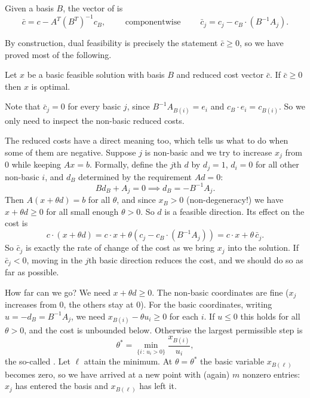 \documentclass[a4paper]{scrartcl}
\begin{document}
\begin{definition}
    Given a basis $B$, the vector of  is
    $$
    \bar c = c - A^T(B^T)^{-1}c_B, \qquad\text{ componentwise }\qquad \bar c_j = c_j - c_B\cdot(B^{-1}A_j).
    $$
\end{definition}

By construction, dual feasibility is precisely the statement $\bar c \geq 0$, so we have proved most of the following.

\begin{theorem}
    Let $x$ be a basic feasible solution with basis $B$ and reduced cost vector $\bar c$. If $\bar c \geq 0$ then $x$ is optimal.
\end{theorem}

Note that $\bar c_j = 0$ for every basic $j$, since $B^{-1}A_{B(i)} = e_i$ and $c_B \cdot e_i = c_{B(i)}$. So we only need to inspect the non-basic reduced costs.

The reduced costs have a direct meaning too, which tells us what to do when some of them are negative. Suppose $j$ is non-basic and we try to increase $x_j$ from $0$ while keeping $Ax = b$. Formally, define the $j$th  $d$ by $d_j = 1$, $d_i = 0$ for all other non-basic $i$, and $d_B$ determined by the requirement $Ad = 0$:
$$
Bd_B + A_j = 0 \implies d_B = -B^{-1}A_j.
$$
Then $A(x + \theta d) = b$ for all $\theta$, and since $x_B > 0$ (non-degeneracy!) we have $x + \theta d \geq 0$ for all small enough $\theta > 0$. So $d$ is a feasible direction. Its effect on the cost is
$$
c\cdot(x + \theta d) = c\cdot x + \theta\left(c_j - c_B\cdot(B^{-1}A_j)\right) = c\cdot x + \theta\,\bar c_j.
$$
So $\bar c_j$ is exactly the rate of change of the cost as we bring $x_j$ into the solution. If $\bar c_j < 0$, moving in the $j$th basic direction reduces the cost, and we should do so as far as possible.

How far can we go? We need $x + \theta d \geq 0$. The non-basic coordinates are fine ($x_j$ increases from $0$, the others stay at $0$). For the basic coordinates, writing $u = -d_B = B^{-1}A_j$, we need $x_{B(i)} - \theta u_i \geq 0$ for each $i$. If $u \leq 0$ this holds for all $\theta > 0$, and the cost is unbounded below. Otherwise the largest permissible step is
$$
\theta^* = \min_{\{i\, :\, u_i > 0\}}\frac{x_{B(i)}}{u_i},
$$
the so-called . Let $\ell$ attain the minimum. At $\theta = \theta^*$ the basic variable $x_{B(\ell)}$ becomes zero, so we have arrived at a new point with (again) $m$ nonzero entries: $x_j$ has entered the basis and $x_{B(\ell)}$ has left it.
\end{document}
